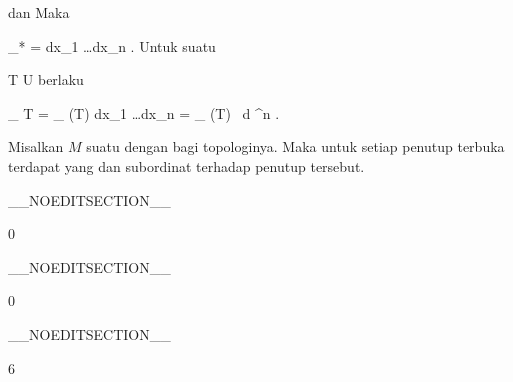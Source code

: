 {{ dan
 Maka

\mavergleichskettedisp
{\vergleichskette
{  \alpha_* \omega
}
{ =} {  dx_1 \wedge \ldots \wedge dx_n
}
{ } {
}
{ } {
}
{ } {
}
}
{}{}{.}
Untuk suatu

\mavergleichskette
{\vergleichskette
{ T
}
{ \subseteq }{ U
}
{  }{
}
{    }{
}
{   }{
}
}
{}{}{}
berlaku

\mavergleichskettedisp
{\vergleichskette
{
\int_{  T   }  \omega
}
{ =} {
\int_{ \alpha(T)  }    dx_1 \wedge \ldots \wedge dx_n
}
{ =} { \int_{ \alpha(T)  }       \,  d \lambda^n
}
{ } {
}
{ } {
}
}
{}{}{.}}{Misalkan $M$ suatu
dengan
bagi topologinya. Maka untuk setiap penutup terbuka terdapat
yang
dan subordinat terhadap penutup tersebut.}

 }

__NOEDITSECTION__

{0}

{

}
{  }

__NOEDITSECTION__

{0}

{

}
{  }

__NOEDITSECTION__

{6}

